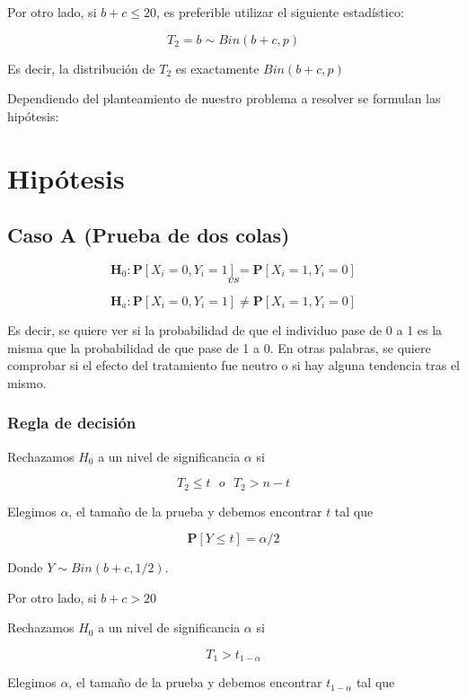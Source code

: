 \documentclass[
  a4paper,
  oneside,
  openany]{book}
\begin{document}
Por otro lado, si \(b+c\leq20\), es preferible utilizar el siguiente estadístico:

\[T_{2}=b\sim Bin(b+c,p)\]

Es decir, la distribución de \(T_{2}\) es exactamente \(Bin(b+c,p)\)

Dependiendo del planteamiento de nuestro problema a resolver se formulan las hipótesis:

\hypertarget{hipuxf3tesis-3}{%
\section{Hipótesis}\label{hipuxf3tesis-3}}

\hypertarget{caso-a-prueba-de-dos-colas-3}{%
\subsection*{Caso A (Prueba de dos colas)}\label{caso-a-prueba-de-dos-colas-3}}


\[\textbf{H}_0: \mathbf{P}[X_{i}=0,Y_{i}=1]= \mathbf{P}[X_{i}=1,Y_{i}=0]\]
\[vs\]

\[\textbf{H}_a: \mathbf{P}[X_{i}=0,Y_{i}=1]\neq \mathbf{P}[X_{i}=1,Y_{i}=0]\]

Es decir, se quiere ver si la probabilidad de que el individuo pase de 0 a 1 es la misma que la probabilidad de que pase de 1 a 0. En otras palabras, se quiere comprobar si el efecto del tratamiento fue neutro o si hay alguna tendencia tras el mismo.

\hypertarget{regla-de-decisiuxf3n-9}{%
\subsubsection*{Regla de decisión}\label{regla-de-decisiuxf3n-9}}


Rechazamos \(H_0\) a un nivel de significancia \(\alpha\) si

\[T_{2} \leq t \ \ \   o \ \ \ T_{2}>n-t\]

Elegimos \(\alpha\), el tamaño de la prueba y debemos encontrar \(t\) tal que

\[\mathbf{P}[Y \leq t]=\alpha/2\]

Donde \(Y \sim Bin (b+c,1/2)\).

Por otro lado, si \(b+c>20\)

Rechazamos \(H_0\) a un nivel de significancia \(\alpha\) si

\[T_{1} > t_{1-\alpha}\]

Elegimos \(\alpha\), el tamaño de la prueba y debemos encontrar \(t_{1-\alpha}\) tal que
\end{document}
